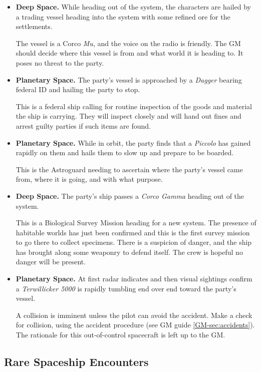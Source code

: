 \begin{itemize}
\item \textbf{Deep Space.} While heading out of the system, the
  characters are hailed by a trading vessel heading into the system
  with some refined ore for the settlements.
  
  The vessel is a Corco \emph{Mu}, and the voice on the radio is
  friendly.  The GM should decide where this vessel is from and what
  world it is heading to.  It poses no threat to the party.
\item \textbf{Planetary Space.} The party's vessel is approached by a
  \emph{Dagger} bearing federal ID and hailing the party to stop.
  
  This is a federal ship calling for routine inspection of the goods
  and material the ship is carrying.  They will inspect closely and
  will hand out fines and arrest guilty parties if such items are
  found.
\item \textbf{Planetary Space.} While in orbit, the party finds that a
  \emph{Piccolo} has gained rapidly on them and hails them to slow up
  and prepare to be boarded.
  
  This is the Astroguard needing to ascertain where the party's vessel
  came from, where it is going, and with what purpose.
\item \textbf{Deep Space.} The party's ship passes a \emph{Corco
    Gamma} heading out of the system.
  
  This is a Biological Survey Mission heading for a new system.  The
  presence of habitable worlds has just been confirmed and this is the
  first survey mission to go there to collect specimens.  There is a
  suspicion of danger, and the ship has brought along some weaponry to
  defend itself.  The crew is hopeful no danger will be present.
\item \textbf{Planetary Space.} At first radar indicates and then
  visual sightings confirm a \emph{Terwillicker 5000} is rapidly
  tumbling end over end toward the party's vessel.
  
  A collision is imminent unless the pilot can avoid the accident.
  Make a check for collision, using the accident procedure (see GM
  guide \ref{GM-sec:accidents}).  The rationale for this
  out-of-control spacecraft is left up to the GM.
\end{itemize}


\subsection{Rare Spaceship Encounters}
\label{sec:rare-spac-enco}

